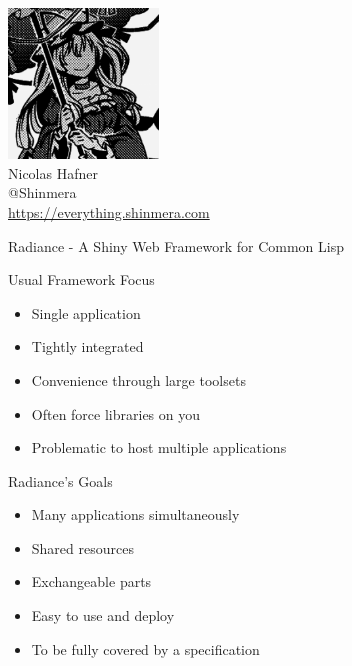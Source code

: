 \documentclass[12pt]{beamer}
\newcommand{\toptitle}[1]{
  {\huge #1} \\
  \vspace{0.2cm}
}
\begin{document}
\begin{frame}
  \begin{center}
    \includegraphics[height=4cm]{avatar.png}\\
    \vspace{0.2cm}
    {\Large Nicolas Hafner} \\
    \vspace{0.2cm}
    {\Huge @Shinmera} \\
    \vspace{0.2cm}
    \url{https://everything.shinmera.com}
  \end{center}
\end{frame}

\begin{frame}
  \toptitle{Radiance - A Shiny Web Framework for Common Lisp}
\end{frame}

\begin{frame}
  \toptitle{Usual Framework Focus}
  \begin{itemize}
    \item Single application
    \item Tightly integrated
    \item Convenience through large toolsets
      \pause
    \item Often force libraries on you
      \pause
    \item Problematic to host multiple applications
  \end{itemize}
\end{frame}

\begin{frame}
  \toptitle{Radiance's Goals}
  \begin{itemize}
    \item Many applications simultaneously
    \item Shared resources
    \item Exchangeable parts
    \item Easy to use and deploy
      \pause
    \item To be fully covered by a specification
  \end{itemize}
\end{frame}
\end{document}
